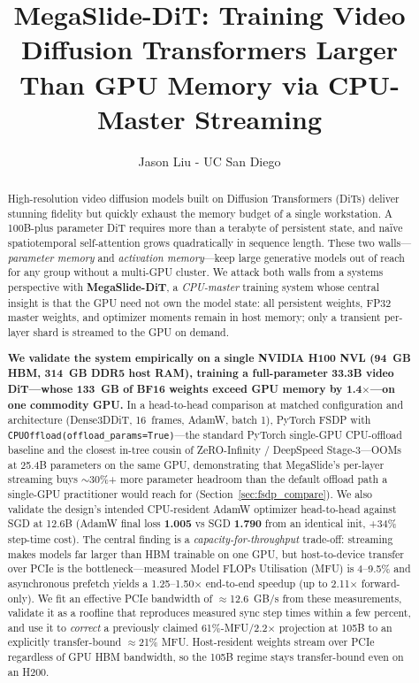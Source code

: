 \documentclass[11pt, letterpaper]{article}
\title{\textbf{MegaSlide-DiT: Training Video Diffusion Transformers Larger Than GPU Memory via CPU-Master Streaming}}
\author{Jason Liu - UC San Diego}
\date{}
\begin{document}
\maketitle

\begin{abstract}
High-resolution video diffusion models built on Diffusion Transformers (DiTs) deliver stunning fidelity but quickly exhaust the memory budget of a single workstation. A 100B-plus parameter DiT requires more than a terabyte of persistent state, and naïve spatiotemporal self-attention grows quadratically in sequence length. These two walls---\emph{parameter memory} and \emph{activation memory}---keep large generative models out of reach for any group without a multi-GPU cluster. We attack both walls from a systems perspective with \textbf{MegaSlide-DiT}, a \emph{CPU-master} training system whose central insight is that the GPU need not own the model state: all persistent weights, FP32 master weights, and optimizer moments remain in host memory; only a transient per-layer shard is streamed to the GPU on demand.

\textbf{We validate the system empirically on a single NVIDIA H100 NVL (94~GB HBM, 314~GB DDR5 host RAM), training a full-parameter 33.3B video DiT---whose 133~GB of BF16 weights exceed GPU memory by 1.4$\times$---on one commodity GPU.} In a head-to-head comparison at matched configuration and architecture (Dense3DDiT, 16~frames, AdamW, batch 1), PyTorch FSDP with \texttt{CPUOffload(offload\_params=True)}---the standard PyTorch single-GPU CPU-offload baseline and the closest in-tree cousin of ZeRO-Infinity / DeepSpeed Stage-3---OOMs at 25.4B parameters on the same GPU, demonstrating that MegaSlide's per-layer streaming buys $\sim$30\%+ more parameter headroom than the default offload path a single-GPU practitioner would reach for (Section~\ref{sec:fsdp_compare}). We also validate the design's intended CPU-resident AdamW optimizer head-to-head against SGD at 12.6B (AdamW final loss \textbf{1.005} vs SGD \textbf{1.790} from an identical init, +34\% step-time cost). The central finding is a \emph{capacity-for-throughput} trade-off: streaming makes models far larger than HBM trainable on one GPU, but host-to-device transfer over PCIe is the bottleneck---measured Model FLOPs Utilisation (MFU) is 4--9.5\% and asynchronous prefetch yields a 1.25--1.50$\times$ end-to-end speedup (up to 2.11$\times$ forward-only). We fit an effective PCIe bandwidth of $\approx$12.6~GB/s from these measurements, validate it as a roofline that reproduces measured sync step times within a few percent, and use it to \emph{correct} a previously claimed 61\%-MFU/2.2$\times$ projection at 105B to an explicitly transfer-bound $\approx$21\% MFU. Host-resident weights stream over PCIe regardless of GPU HBM bandwidth, so the 105B regime stays transfer-bound even on an H200.


\end{abstract}
\end{document}
